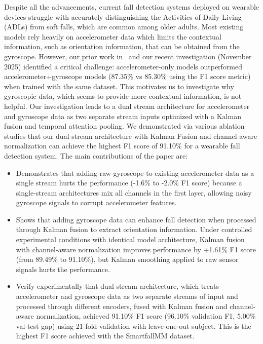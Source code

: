 \documentclass[conference]{IEEEtran}
\begin{document}
Despite all the advancements, current fall detection systems deployed on wearable devices 
struggle with accurately distinguishing the Activities of Daily Living
(ADLs) from soft falls, which are common among older adults. Most
existing models rely heavily on accelerometer data 
which limits the contextual information, such as orientation information, that can be obtained from the gyroscope. However, our prior work in~\cite{awatif} and our recent investigation (November 2025) identified a critical challenge: accelerometer-only models outperformed accelerometer+gyroscope models (87.35\% vs 85.30\% using the F1 score metric) when trained with the same dataset.   This motivates us to investigate why gyroscopic data, which seems to provide more contextual information, is not helpful. Our investigation leads to a dual stream architecture for accelerometer and gyroscope data as two separate stream inputs optimized with a Kalman fusion and temporal attention pooling. We demonstrated via various ablation studies that our dual stream architecture with Kalman Fusion and channel-aware normalization can achieve the highest F1 score of 91.10\% for a wearable fall detection system.
The main contributions of the paper are:
\begin{itemize}
\item Demonstrates that adding raw gyroscope to existing accelerometer data as a single stream hurts the performance (-1.6\% to -2.0\% F1 score) because a single-stream architectures mix all channels in the first layer, allowing
noisy gyroscope signals 
to corrupt accelerometer features. 
\item Shows that adding gyroscope data can enhance fall detection when processed through Kalman fusion to
extract orientation information. Under controlled experimental conditions with identical model architecture, Kalman fusion with channel-aware normalization improves performance by +1.61\% F1 score (from 89.49\% to 91.10\%),
but Kalman smoothing applied to raw sensor signals hurts the performance.
\item Verify experimentally that dual-stream architecture, which treats accelerometer and gyroscope data as two separate streams of input and processed through different encoders, fused with Kalman fusion and channel-aware normalization, achieved 91.10\% F1 score (96.10\% validation F1, 5.00\% val-test gap) using 21-fold validation with leave-one-out subject. This is the highest F1 score achieved with the SmartfallMM dataset.
\end{itemize}
\end{document}

